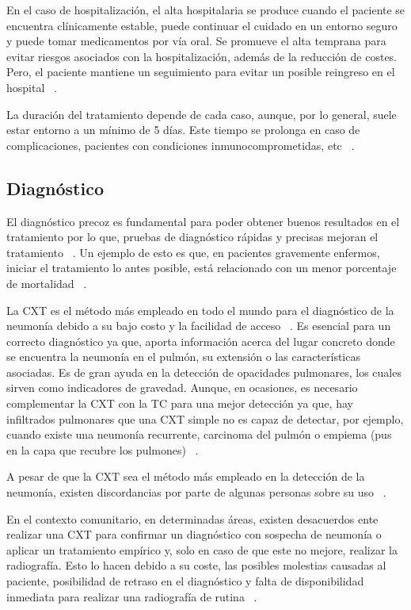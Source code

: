En el caso de hospitalización, el alta hospitalaria se produce cuando el paciente se encuentra clínicamente estable, puede continuar el cuidado en un entorno seguro y puede tomar medicamentos por vía oral. Se promueve el alta temprana para evitar riesgos asociados con la hospitalización, además de la reducción de costes. Pero, el paciente mantiene un seguimiento para evitar un posible reingreso en el hospital ~\cite{file2023community}.

La duración del tratamiento depende de cada caso, aunque, por lo general, suele estar entorno a un mínimo de 5 días. Este tiempo se prolonga en caso de complicaciones, pacientes con condiciones inmunocomprometidas, etc ~\cite{file2023community}.

\subsection{Diagnóstico}

El diagnóstico precoz es fundamental para poder obtener buenos resultados en el tratamiento por lo que, pruebas de diagnóstico rápidas y precisas mejoran el tratamiento ~\cite{antoni2021}. Un ejemplo de esto es que, en pacientes gravemente enfermos, iniciar el tratamiento lo antes posible, está relacionado con un menor porcentaje de mortalidad ~\cite{lim2022pneumonia}.

La CXT es el método más empleado en todo el mundo para el diagnóstico de la neumonía debido a su bajo costo y la facilidad de acceso ~\cite{li2020accuracy}. Es esencial para un correcto diagnóstico ya que, aporta información acerca del lugar concreto donde se encuentra la neumonía en el pulmón, su extensión o las características asociadas. Es de gran ayuda en la detección de opacidades pulmonares, los cuales sirven como indicadores de gravedad. Aunque, en ocasiones, es necesario complementar la CXT con la TC para una mejor detección ya que, hay infiltrados pulmonares que una CXT simple no es capaz de detectar, por ejemplo, cuando existe una neumonía recurrente, carcinoma del pulmón o empiema (pus en la capa que recubre los pulmones) ~\cite{antoni2021}.

A pesar de que la CXT sea el método más empleado en la detección de la neumonía, existen discordancias por parte de algunas personas sobre su uso ~\cite{wootton2014diagnosis}.

En el contexto comunitario, en determinadas áreas, existen desacuerdos ente realizar una CXT para confirmar un diagnóstico con sospecha de neumonía o aplicar un tratamiento empírico y, solo en caso de que este no mejore, realizar la radiografía. Esto lo hacen debido a su coste, las posibles molestias causadas al paciente, posibilidad de retraso en el diagnóstico y falta de disponibilidad inmediata para realizar una radiografía de rutina ~\cite{wootton2014diagnosis}. 

